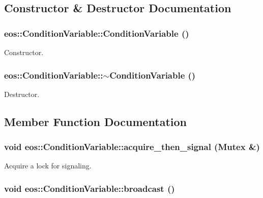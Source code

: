 \subsection{Constructor \& Destructor Documentation}
\hypertarget{classeos_1_1ConditionVariable_a64b2350d3ef0bf6c58f0f063da7a4ea4}{
\subsubsection[{ConditionVariable}]{\setlength{\rightskip}{0pt plus 5cm}eos::ConditionVariable::ConditionVariable ()}}
\label{classeos_1_1ConditionVariable_a64b2350d3ef0bf6c58f0f063da7a4ea4}


Constructor. \hypertarget{classeos_1_1ConditionVariable_abf981bbbce2e09c235d461f7aea14479}{
\subsubsection[{$\sim$ConditionVariable}]{\setlength{\rightskip}{0pt plus 5cm}eos::ConditionVariable::$\sim$ConditionVariable ()}}
\label{classeos_1_1ConditionVariable_abf981bbbce2e09c235d461f7aea14479}


Destructor. 

\subsection{Member Function Documentation}
\hypertarget{classeos_1_1ConditionVariable_adc82f6f8edc7d82776fe183d7f647d2c}{
\subsubsection[{acquire\_\-then\_\-signal}]{\setlength{\rightskip}{0pt plus 5cm}void eos::ConditionVariable::acquire\_\-then\_\-signal ({\bf Mutex} \&)}}
\label{classeos_1_1ConditionVariable_adc82f6f8edc7d82776fe183d7f647d2c}


Acquire a lock for signaling. \hypertarget{classeos_1_1ConditionVariable_a353db40ed7ea89d107627a4f32b829fe}{
\subsubsection[{broadcast}]{\setlength{\rightskip}{0pt plus 5cm}void eos::ConditionVariable::broadcast ()}}
\label{classeos_1_1ConditionVariable_a353db40ed7ea89d107627a4f32b829fe}


